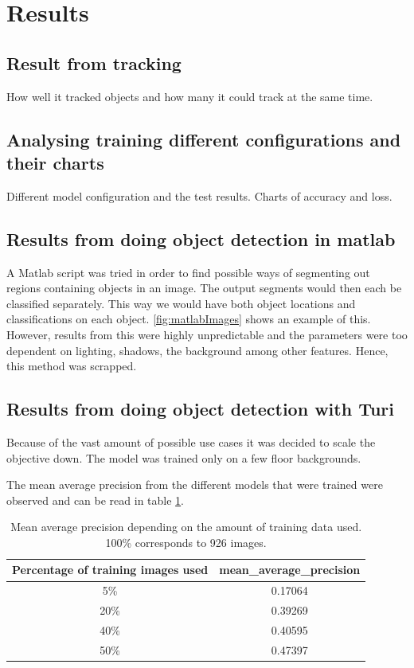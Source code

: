 \section{Results}
\subsection{Result from tracking}

How well it tracked objects and how many it could track at the same time.

\subsection{Analysing training different configurations and their charts}

Different model configuration and the test results. Charts of accuracy and loss.

\subsection{Results from doing object detection in matlab}
A Matlab script was tried in order to find possible ways of segmenting out regions containing objects in an image. The output segments would then each be classified separately. This way we would have both object locations and classifications on each object. \ref{fig:matlabImages} shows an example of this. However, results from this were highly unpredictable and the parameters were too dependent on lighting, shadows, the background among other features. Hence, this method was scrapped.

\subsection{Results from doing object detection with Turi}
Because of the vast amount of possible use cases it was decided to scale the objective down. The model was trained only on a few floor backgrounds. 

The mean average precision from the different models that were trained were observed and can be read in table \ref{table:mAP}. 

\begin{table}[h]
\centering
\begin{tabular}{ |c|c| } 
 \hline
 Percentage of training images used & mean\_average\_precision  \\ 
 \hline
 5\% & 0.17064 \\ 
 \hline
 20\% & 0.39269 \\ 
 \hline
 40\% & 0.40595 \\
 \hline
 50\% & 0.47397 \\
 \hline
\end{tabular}
\caption{Mean average precision depending on the amount of training data used. 100\% corresponds to 926 images.}
\label{table:mAP}
\end{table}

